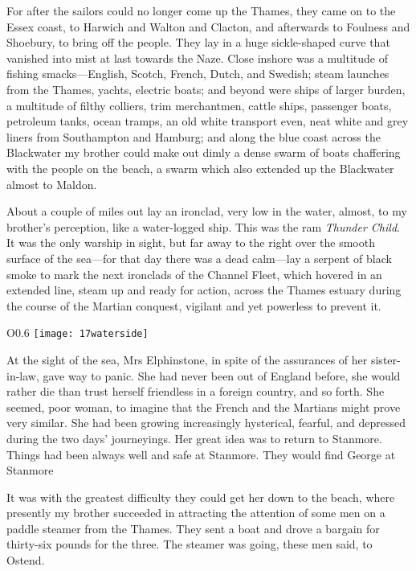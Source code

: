 For after the sailors could no longer come up the Thames, they came on to the Essex coast, to Harwich and Walton and Clacton, and afterwards to Foulness and Shoebury, to bring off the people. They lay in a huge sickle-shaped curve that vanished into mist at last towards the Naze. Close inshore was a multitude of fishing smacks—English, Scotch, French, Dutch, and Swedish; steam launches from the Thames, yachts, electric boats; and beyond were ships of larger burden, a multitude of filthy colliers, trim merchantmen, cattle ships, passenger boats, petroleum tanks, ocean tramps, an old white transport even, neat white and grey liners from Southampton and Hamburg; and along the blue coast across the Blackwater my brother could make out dimly a dense swarm of boats chaffering with the people on the beach, a swarm which also extended up the Blackwater almost to Maldon.

About a couple of miles out lay an ironclad, very low in the water, almost, to my brother's perception, like a water-logged ship. This was the ram \textit{Thunder Child}. It was the only warship in sight, but far away to the right over the smooth surface of the sea—for that day there was a dead calm—lay a serpent of black smoke to mark the next ironclads of the Channel Fleet, which hovered in an extended line, steam up and ready for action, across the Thames estuary during the course of the Martian conquest, vigilant and yet powerless to prevent it.

\begin{wrapfigure}{O}{0.6\textwidth}
\centering
\texttt{[image: 17waterside]}
\end{wrapfigure}


At the sight of the sea, Mrs Elphinstone, in spite of the assurances of her sister-in-law, gave way to panic. She had never been out of England before, she would rather die than trust herself friendless in a foreign country, and so forth. She seemed, poor woman, to imagine that the French and the Martians might prove very similar. She had been growing increasingly hysterical, fearful, and depressed during the two days' journeyings. Her great idea was to return to Stanmore. Things had been always well and safe at Stanmore. They would find George at Stanmore\textellipsis

It was with the greatest difficulty they could get her down to the beach, where presently my brother succeeded in attracting the attention of some men on a paddle steamer from the Thames. They sent a boat and drove a bargain for thirty-six pounds for the three. The steamer was going, these men said, to Ostend.

